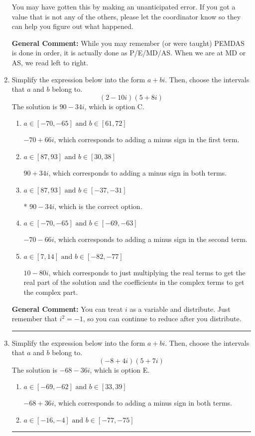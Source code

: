 \documentclass{extbook}[14pt]
\newcommand{\litem}[1]{\item #1

\rule{\textwidth}{0.4pt}}
\begin{document}
\begin{enumerate}
{\begin{enumerate}[label=\Alph*.]
 You may have gotten this by making an unanticipated error. If you got a value that is not any of the others, please let the coordinator know so they can help you figure out what happened.
\end{enumerate}

\textbf{General Comment:} While you may remember (or were taught) PEMDAS is done in order, it is actually done as P/E/MD/AS. When we are at MD or AS, we read left to right.
}
\litem{
Simplify the expression below into the form $a+bi$. Then, choose the intervals that $a$ and $b$ belong to.
\[ (2 - 10 i)(5 + 8 i) \]The solution is \( 90 - 34 i \), which is option C.\begin{enumerate}[label=\Alph*.]
\item \( a \in [-70, -65] \text{ and } b \in [61, 72] \)

 $-70 + 66 i$, which corresponds to adding a minus sign in the first term.
\item \( a \in [87, 93] \text{ and } b \in [30, 38] \)

 $90 + 34 i$, which corresponds to adding a minus sign in both terms.
\item \( a \in [87, 93] \text{ and } b \in [-37, -31] \)

* $90 - 34 i$, which is the correct option.
\item \( a \in [-70, -65] \text{ and } b \in [-69, -63] \)

 $-70 - 66 i$, which corresponds to adding a minus sign in the second term.
\item \( a \in [7, 14] \text{ and } b \in [-82, -77] \)

 $10 - 80 i$, which corresponds to just multiplying the real terms to get the real part of the solution and the coefficients in the complex terms to get the complex part.
\end{enumerate}

\textbf{General Comment:} You can treat $i$ as a variable and distribute. Just remember that $i^2=-1$, so you can continue to reduce after you distribute.
}
\litem{
Simplify the expression below into the form $a+bi$. Then, choose the intervals that $a$ and $b$ belong to.
\[ (-8 + 4 i)(5 + 7 i) \]The solution is \( -68 - 36 i \), which is option E.\begin{enumerate}[label=\Alph*.]
\item \( a \in [-69, -62] \text{ and } b \in [33, 39] \)

 $-68 + 36 i$, which corresponds to adding a minus sign in both terms.
\item \( a \in [-16, -4] \text{ and } b \in [-77, -75] \)


\end{enumerate}}
\end{enumerate}
\end{document}
